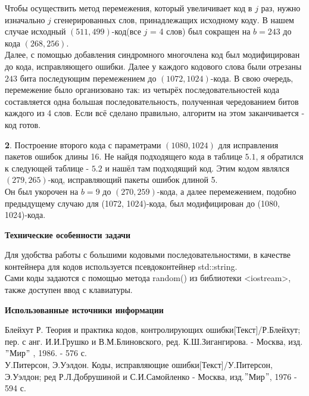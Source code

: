 \documentclass{article}
\begin{document}
   		Чтобы осуществить метод перемежения, который увеличивает код в $j$ раз, нужно изначально $j$ сгенерированных слов, принадлежащих исходному коду.
   		В нашем случае исходный $(511, 499)$-код(все $j$ = 4 слов) был сокращен на $b = 243$ до кода $(268, 256)$.\\
   		Далее, с помощью добавления синдромного многочлена код был модифицирован до кода, исправляющего ошибки. Далее у каждого кодового слова были отрезаны $243$ бита последующим перемежением до $(1072, 1024)$-кода. В свою очередь, перемежение было организовано так: из четырёх последовательностей кода составляется одна большая последовательность, полученная чередованием битов каждого из 4 слов. Если всё сделано правильно, алгоритм на этом заканчивается - код готов. 
   		
   		
   		\textbf{2}. Построение второго кода с параметрами $(1080, 1024)$ для исправления пакетов ошибок длины 16. 
   		Не найдя подходящего кода в таблице $5.1$, я обратился к следующей таблице - $5.2$ и нашёл там подходящий код.
   		Этим кодом являлся $(279, 265)$-код, исправляющий пакеты ошибок длиной 5.\\
   		Он был укорочен на $b = 9$ до $(270, 259)$-кода, а далее перемежением, подобно предыдущему случаю для (1072, 1024)-кода, был модифицирован до (1080, 1024)-кода.
   		
   		
   		 
   		\begin{center}
   			\large \textbf {Технические особенности задачи}
   		\end{center}
   	
   		Для удобства работы с большими кодовыми последовательностями, в качестве контейнера для кодов используется псевдоконтейнер std::string.\\	 
   		Сами коды задаются с помощью метода random() из библиотеки <iostream>, также доступен ввод с клавиатуры.  
   		 
   		 
   		\newpage
   		\begin{center}
   			\large \textbf {Использованные источники информации}
   		\end{center}
   		Блейхут Р. Теория и практика кодов, контролирующих ошибки[Текст]/Р.Блейхут; пер. с анг. И.И.Грушко и В.М.Блиновского, ред. К.Ш.Зигангирова. - Москва, изд.$"$Мир$"$ , 1986. - 576 с.
   		\\
   		
   		
   		У.Питерсон, Э.Уэлдон. Коды, исправляющие ошибки[Текст]/У.Питерсон, Э.Уэлдон; ред Р.Л.Добрушиной и С.И.Самойленко - Москва, изд.$"$Мир$"$, 1976 - 594 с.
        
        
\end{document}
